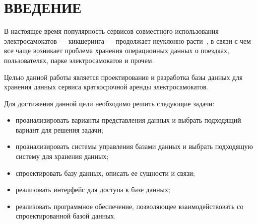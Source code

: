 \chapter*{ВВЕДЕНИЕ}

В настоящее время популярность сервисов совместного использования электросамокатов --- кикшеринга --- продолжает неуклонно расти~\cite{popularity}, в связи с чем все чаще возникает проблема хранения операционных данных о поездках, пользователях, парке электросамокатов и прочем.

Целью данной работы является проектирование и разработка базы данных для хранения данных сервиса краткосрочной аренды электросамокатов.

Для достижения данной цели необходимо решить следующие задачи:

\begin{itemize}
    \item проанализировать варианты представления данных и выбрать подходящий вариант для решения задачи;
    \item проанализировать системы управления базами данных и выбрать подходящую систему для хранения данных;
    \item спроектировать базу данных, описать ее сущности и связи;
    \item реализовать интерфейс для доступа к базе данных;
    \item реализовать программное обеспечение, позволяющее взаимодействовать со спроектированной базой данных.
\end{itemize}
